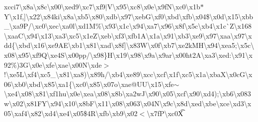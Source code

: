 {}xcci7\textbackslash{}x8a\textbackslash{}x8c\textbackslash{}x00\textbackslash{}xed9\textbackslash{}xc7\textbackslash{}xf9$\vert$\+V\textbackslash{}x95\textbackslash{}xc8\textbackslash{}x0e\textbackslash{}x9f\+N\textbackslash{}xc0\textbackslash{}x1b$\ast$\+Y\textbackslash{}x1f,\mbox{]}\textbackslash{}x22\textbackslash{}x84ki\textbackslash{}x8a\textbackslash{}xb5\textbackslash{}x80\textbackslash{}xdb\textbackslash{}x97\textbackslash{}xeb\+G\textbackslash{}xf0\textbackslash{}xbd\textbackslash{}xfb\textbackslash{}x04\$\textbackslash{}x0d\textbackslash{}x15\textbackslash{}xbb\+\_\+\textbackslash{}xa9\textquotesingle{}\+P/\textbackslash{}xc0\textbackslash{}xec\textbackslash{}xa0l\textbackslash{}xd1\+M\%\textbackslash{}x93\textbackslash{}x1c\textbackslash{}x94\textbackslash{}xa7\textbackslash{}x96\textbackslash{}x8f\textbackslash{}x5c\textbackslash{}xb4\textbackslash{}x1c\`{}\+Z\textbackslash{}x168\textbackslash{}xaa\+C\textbackslash{}x94\textbackslash{}x13\textbackslash{}xa3\textbackslash{}xc5\textbackslash{}x1e\+Z\textbackslash{}xeb\textbackslash{}xf3\textbackslash{}xfb1\+A\textbackslash{}x1a\textbackslash{}x91\textbackslash{}xb3\textbackslash{}xe9\textbackslash{}x97\textbackslash{}xaa\textbackslash{}x97\textbackslash{}xdd\{\textbackslash{}xbd\textbackslash{}x16\textbackslash{}xe9\+A\+E\textbackslash{}xb1\textbackslash{}x81\textbackslash{}xad\textbackslash{}x8f\mbox{]}\textbackslash{}x83\+W\textbackslash{}x0f\textbackslash{}xb7\textbackslash{}xe2\textquotesingle{}k\+M\+H\textbackslash{}x94\textbackslash{}xea5;\textbackslash{}x5c\textbackslash{}x08\textbackslash{}x95\textbackslash{}xf9\+Q\textbackslash{}xe4\+S\textbackslash{}x00pp/\textbackslash{}x98\}\+H\textbackslash{}x19\textbackslash{}x98\textbackslash{}x9a\textbackslash{}x9ar\textbackslash{}x00ht2\+A\textbackslash{}xa3\textbackslash{}xed\+:\textbackslash{}x91\textbackslash{}x92\%)3\+G\textbackslash{}x0e\textbackslash{}xfe\textbackslash{}xae\textbackslash{}x00\+N\textbackslash{}xde$>$!\textbackslash{}xe5\+L\textbackslash{}xf4\textbackslash{}xc5\+\_\+\textbackslash{}x81\textbackslash{}xa8)\textbackslash{}x89h/\textbackslash{}xb4\textbackslash{}xe89\textbackslash{}xcc\textbackslash{}xcf\textbackslash{}x1f\textbackslash{}xc5\textbackslash{}x1a\textbackslash{}xba\+X\textbackslash{}x0c\+G\textbackslash{}x06\textbackslash{}xb0\textbackslash{}xbd\textbackslash{}x85\textbackslash{}xa1\{\textbackslash{}xc0\textbackslash{}x85\textbackslash{}x07o\textbackslash{}xae@\+U\+U\textbackslash{}x15\textbackslash{}xfe$\sim$\textbackslash{}xe4\textbackslash{}x08\textbackslash{}x81\textbackslash{}xf1hu\textbackslash{}x0e\textbackslash{}xea\textbackslash{}x08\textbackslash{}x8b\textbackslash{}xa2w\+J\textbackslash{}x90\textbackslash{}x05\textbackslash{}xcf\textbackslash{}x90\textbackslash{}xd4);\textbackslash{}xb6\textbackslash{}x083w\textbackslash{}x02\textbackslash{}x81\+F\+Y\textbackslash{}x94\textbackslash{}x10\textbackslash{}x8b\+F\textbackslash{}x11\textbackslash{}x08\textbackslash{}x063\textbackslash{}x04\+N\textbackslash{}x9c\textbackslash{}x8d\textbackslash{}xed\textbackslash{}xbe\textbackslash{}xce\textbackslash{}xd3\textbackslash{}x05\textbackslash{}xaf4\textbackslash{}x82\textbackslash{}xd4\textbackslash{}xe4\textbackslash{}x05\$4\+R\textbackslash{}xfb\textbackslash{}xb9\textbackslash{}x02$<$\textbackslash{}x7f\+P\textbackslash{}xc0\+X\t